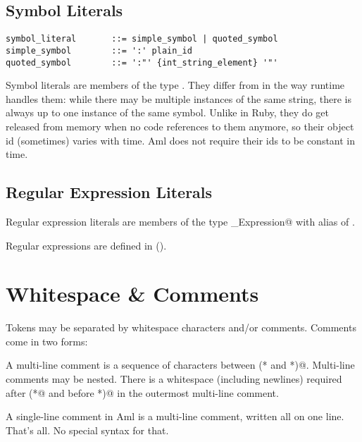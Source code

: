 \subsection{Symbol Literals}
\label{sec:symbolliterals}

\syntax\begin{lstlisting}
symbol_literal       ::= simple_symbol | quoted_symbol
simple_symbol        ::= ':' plain_id
quoted_symbol        ::= ':"' {int_string_element} '"'
\end{lstlisting}

Symbol literals are members of the type \lstinline@Symbol@. They differ from  in the way runtime handles them: while there may be multiple instances of the same string, there is always up to one instance of the same symbol. Unlike in Ruby, they do get released from memory when no code references to them anymore, so their object id (sometimes) varies with time. Aml does not require their ids to be constant in time. 









\subsection{Regular Expression Literals}
\label{sec:regexpliterals}

Regular expression literals are members of the type \lstinline@Regular_Expression@ with alias of \lstinline@Regexp@. 

Regular expressions are defined in (). 





\section{Whitespace \& Comments}
\label{sec:whitespacecomments}

Tokens may be separated by whitespace characters and/or comments. Comments come in two forms: 

A multi-line comment is a sequence of characters between \lstinline@(* and *)@. Multi-line comments may be nested. There is a whitespace (including newlines) required after \lstinline@(*@ and before \lstinline@*)@ in the outermost multi-line comment. 

A single-line comment in Aml is a multi-line comment, written all on one line. That's all. No special syntax for that. 

